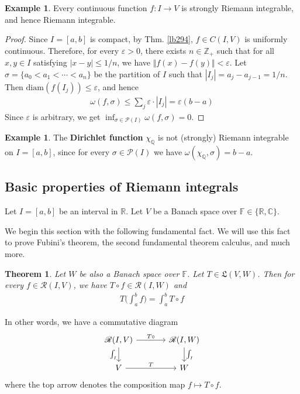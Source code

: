 \documentclass[12pt,b5paper,notitlepage]{article}
\theoremstyle{definition}
\newtheorem{eg}[df]{Example}
\theoremstyle{plain}
\newtheorem{thm}[df]{Theorem}
\newcommand{\fk}{\mathfrak}
\newcommand{\mc}{\mathcal}
\newcommand{\scr}{\mathscr}
\newcommand{\Cbb}{\mathbb C}
\newcommand{\Zbb}{\mathbb Z}
\newcommand{\Qbb}{\mathbb Q}
\newcommand{\Rbb}{\mathbb R}
\newcommand{\Fbb}{\mathbb F}
\newcommand{\diam}{\mathrm{diam}}
\newcommand{\eps}{\varepsilon}
\numberwithin{equation}{section}
\begin{document}
\begin{eg}\label{lb377}
Every continuous function $f:I\rightarrow V$ is strongly Riemann integrable, and hence Riemann integrable.
\end{eg}


\begin{proof}
Since $I=[a,b]$ is compact, by Thm. \ref{lb294}, $f\in C(I,V)$ is uniformly continuous. Therefore, for every $\eps>0$, there exists $n\in\Zbb_+$ such that for all $x,y\in I$ satisfying $|x-y|\leq 1/n$, we have $\Vert f(x)-f(y)\Vert<\eps$. Let $\sigma=\{a_0<a_1<\cdots<a_n\}$ be the partition of $I$ such that $|I_j|=a_j-a_{j-1}=1/n$. Then $\diam(f(I_j))\leq\eps$, and hence
\begin{align*}
\omega(f,\sigma)\leq\sum_j \eps\cdot|I_j|=\eps(b-a)
\end{align*}
Since $\eps$ is arbitrary, we get $\inf_{\sigma\in\mc P(I)} \omega(f,\sigma)=0$.
\end{proof}


\begin{eg}
The \textbf{Dirichlet function} $\chi_\Qbb$ is not (strongly) Riemann integrable on $I=[a,b]$, since for every $\sigma\in\mc P(I)$ we have $\omega(\chi_\Qbb,\sigma)=b-a$.
\end{eg}




\subsection{Basic properties of Riemann integrals}


Let $I=[a,b]$ be an interval in $\Rbb$. Let $V$ be a Banach space over $\Fbb\in\{\Rbb,\Cbb\}$. 

We begin this section with the following fundamental fact. We will use this fact to prove Fubini's theorem, the second fundamental theorem calculus, and much more.


\begin{thm}\label{lb392}
Let $W$ be also a Banach space over $\Fbb$. Let $T\in\fk L(V,W)$. Then for every $f\in\scr R(I,V)$, we have $T\circ f\in\scr R(I,W)$ and
\begin{align}
T\Big(\int_a^b f \Big)=\int_a^b T\circ f
\end{align}
\end{thm}

In other words, we have a commutative diagram
\begin{equation}\label{eq166}
\begin{tikzcd}[column sep=large]
\scr R(I,V) \arrow[r,"T\circ"] \arrow[d,"\int_I"'] & \scr R(I,W) \arrow[d,"\int_I"] \\
V \arrow[r,"T"]           & W        
\end{tikzcd} 
\end{equation}
where the top arrow denotes the composition map $f\mapsto T\circ f$. 
\end{document}
